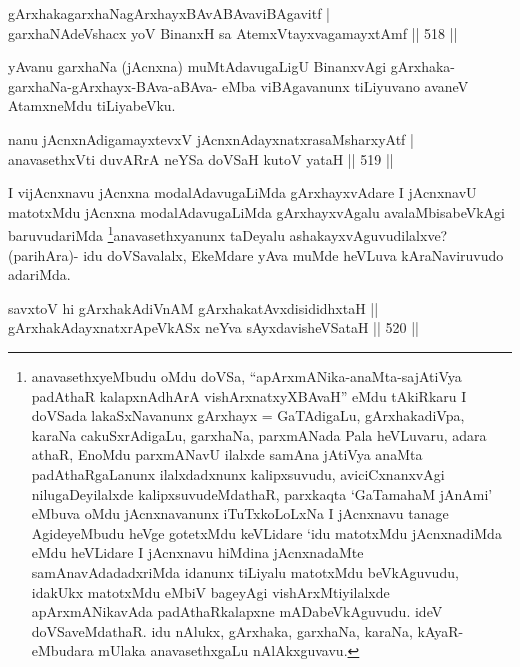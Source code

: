 
\begin{shl}
gArxhakagarxhaNagArxhayxBAvABAvaviBAgavitf | \\
garxhaNAdeVshacx yoV BinanxH sa AtemxVtayxvagamayxtAmf \hfill||  518 ||  
\end{shl}

\begin{artha}
yAvanu garxhaNa (jAcnxna) muMtAdavugaLigU BinanxvAgi gArxhaka-garxhaNa-gArxhayx-BAva-aBAva- eMba viBAgavanunx tiLiyuvano avaneV AtamxneMdu tiLiyabeVku.
\end{artha}


\begin{shl}
nanu jAcnxnAdigamayxtevxV jAcnxnAdayxnatxrasaMsharxyAtf | \\
anavasethxVti duvARrA neYSa doVSaH kutoV yataH \hfill||  519 ||  
\end{shl}

\begin{artha}
I vijAcnxnavu jAcnxna modalAdavugaLiMda gArxhayxvAdare I jAcnxnavU matotxMdu jAcnxna modalAdavugaLiMda gArxhayxvAgalu avalaMbisabeVkAgi baruvudariMda \footnote{anavasethxyeMbudu oMdu doVSa, ``apArxmANika-anaMta-sajAtiVya padAthaR kalapxnAdhArA vishArxnatxyXBAvaH'' eMdu tAkiRkaru I doVSada lakaSxNavanunx gArxhayx =  GaTAdigaLu, gArxhakadiVpa, karaNa cakuSxrAdigaLu, garxhaNa, parxmANada Pala heVLuvaru, adara athaR, EnoMdu parxmANavU ilalxde samAna jAtiVya anaMta padAthaRgaLanunx ilalxdadxnunx kalipxsuvudu, aviciCxnanxvAgi nilugaDeyilalxde kalipxsuvudeMdathaR, parxkaqta `GaTamahaM jAnAmi' eMbuva oMdu jAcnxnavanunx iTuTxkoLoLxNa I jAcnxnavu tanage AgideyeMbudu heVge gotetxMdu keVLidare `idu matotxMdu jAcnxnadiMda eMdu heVLidare I jAcnxnavu hiMdina jAcnxnadaMte samAnavAdadadxriMda idanunx tiLiyalu matotxMdu beVkAguvudu, idakUkx matotxMdu eMbiV bageyAgi vishArxMtiyilalxde apArxmANikavAda padAthaRkalapxne mADabeVkAguvudu. ideV doVSaveMdathaR. idu nAlukx, gArxhaka, garxhaNa, karaNa, kAyaR-eMbudara mUlaka anavasethxgaLu nAlAkxguvavu.}anavasethxyanunx taDeyalu ashakayxvAguvudilalxve? (parihAra)- idu doVSavalalx, EkeMdare yAva muMde heVLuva kAraNaviruvudo adariMda.
\end{artha}

\begin{shl}
savxtoV hi gArxhakAdiVnAM gArxhakatAvxdisididhxtaH ||  \\
gArxhakAdayxnatxrApeVkASx neYva sAyxdavisheVSataH \hfill||  520 ||  
\end{shl}

